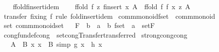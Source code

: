 \begin{isabellebody}
\isanewline
\ \ \isamarkupfalse%
\ ffold{\isacharunderscore}finsert{\isacharunderscore}idem{}{\isacharcolon}\isanewline
\ \ \ \ {\isachardoublequoteopen}ffold\ f\ z\ {\isacharparenleft}finsert\ x\ A{\isacharparenright}\ {\isacharequal}\ ffold\ f\ {\isacharparenleft}f\ x\ z{\isacharparenright}\ A{\isachardoublequoteclose}\isanewline
%
\isadelimproof
\ \ \ \ %
\endisadelimproof
%
\isatagproof
{}\isamarkupfalse%
\ {\isacharparenleft}transfer\ fixing{\isacharcolon}\ f{\isacharparenright}\ {\isacharparenleft}rule\ fold{\isacharunderscore}insert{\isacharunderscore}idem{}{\isacharparenright}%
\endisatagproof
{\isafoldproof}%
%
\isadelimproof
\isanewline
%
\endisadelimproof
\isanewline
{}\isamarkupfalse%
%
\isadelimdocument
%
\endisadelimdocument
%
\isatagdocument
%
\isamarkuptrue%
%
\endisatagdocument
{\isafolddocument}%
%
\isadelimdocument
%
\endisadelimdocument
{}\isamarkupfalse%
\ comm{\isacharunderscore}monoid{\isacharunderscore}fset\ {\isacharequal}\ comm{\isacharunderscore}monoid\isanewline
{}\isanewline
\isanewline
{}\isamarkupfalse%
\ set{\isacharcolon}\ comm{\isacharunderscore}monoid{\isacharunderscore}set%
\isadelimproof
\ %
\endisadelimproof
%
\isatagproof
\isacommand{{\isachardot}{\isachardot}}\isamarkupfalse%
%
\endisatagproof
{\isafoldproof}%
%
\isadelimproof
%
\endisadelimproof
\isanewline
\isanewline
{}\isamarkupfalse%
\ F\ {\isacharcolon}{\isacharcolon}\ {\isachardoublequoteopen}{\isacharparenleft}{\isacharprime}b\ {\isasymRightarrow}\ {\isacharprime}a{\isacharparenright}\ {\isasymRightarrow}\ {\isacharprime}b\ fset\ {\isasymRightarrow}\ {\isacharprime}a{\isachardoublequoteclose}\ \ set{\isachardot}F%
\isadelimproof
\ %
\endisadelimproof
%
\isatagproof
\isacommand{{\isachardot}}\isamarkupfalse%
%
\endisatagproof
{\isafoldproof}%
%
\isadelimproof
%
\endisadelimproof
\isanewline
\isanewline
{}\isamarkupfalse%
\ cong{\isacharbrackleft}fundef{\isacharunderscore}cong{\isacharbrackright}\ {\isacharequal}\ set{\isachardot}cong{\isacharbrackleft}Transfer{\isachardot}transferred{\isacharbrackright}\isanewline
\isanewline
{}\isamarkupfalse%
\ strong{\isacharunderscore}cong{\isacharbrackleft}cong{\isacharbrackright}{\isacharcolon}\isanewline
\ \ \ {\isachardoublequoteopen}A\ {\isacharequal}\ B{\isachardoublequoteclose}\ {\isachardoublequoteopen}{\isasymAnd}x{\isachardot}\ x\ {\isacharbar}{\isasymin}{\isacharbar}\ B\ {\isacharequal}simp{\isacharequal}{\isachargreater}\ g\ x\ {\isacharequal}\ h\ x{\isachardoublequoteclose}\isanewline

\end{isabellebody}
